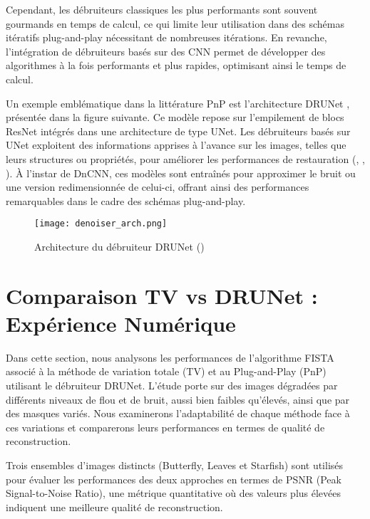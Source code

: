 \documentclass[a4paper, 12pt]{report} %
\begin{document}
Cependant, les débruiteurs classiques les plus performants sont souvent gourmands en temps de calcul, ce qui limite leur utilisation dans des schémas itératifs plug-and-play nécessitant de nombreuses itérations. En revanche, l’intégration de débruiteurs basés sur des CNN permet de développer des algorithmes à la fois performants et plus rapides, optimisant ainsi le temps de calcul.

Un exemple emblématique dans la littérature PnP est l’architecture DRUNet \cite{zhang2021plug}, présentée dans la figure suivante. Ce modèle repose sur l’empilement de blocs ResNet \cite{he2016deep} intégrés dans une architecture de type UNet. Les débruiteurs basés sur UNet exploitent des informations apprises à l’avance sur les images, telles que leurs structures ou propriétés, pour améliorer les performances de restauration (\cite{ho2020denoising}, \cite{song2019generative}, \cite{song2021train}). À l’instar de DnCNN, ces modèles sont entraînés pour approximer le bruit ou une version redimensionnée de celui-ci, offrant ainsi des performances remarquables dans le cadre des schémas plug-and-play.

\begin{figure}[H]
\centering
\begin{adjustbox}{width=1.54 \linewidth, totalheight=0.3 \textheight, angle=0, scale= 0.65, minipage= 2\linewidth, margin= 0}
\texttt{[image: denoiser\_arch.png]}
\end{adjustbox}
\caption{Architecture du débruiteur DRUNet (\cite{zhang2021plug})} 
    
    \label{fig:3}
\end{figure}   


\section{Comparaison TV vs DRUNet : Expérience Numérique} 

Dans cette section, nous analysons les performances de l'algorithme FISTA associé à la méthode de variation totale (TV) et au Plug-and-Play (PnP) utilisant le débruiteur DRUNet. L'étude porte sur des images dégradées par différents niveaux de flou et de bruit, aussi bien faibles qu’élevés, ainsi que par des masques variés. Nous examinerons l’adaptabilité de chaque méthode face à ces variations et comparerons leurs performances en termes de qualité de reconstruction.

 Trois ensembles d’images distincts (Butterfly, Leaves et Starfish) sont utilisés pour évaluer les performances des deux approches en termes de PSNR (Peak Signal-to-Noise Ratio), une métrique quantitative où des valeurs plus élevées indiquent une meilleure qualité de reconstruction.
 
\end{document}
